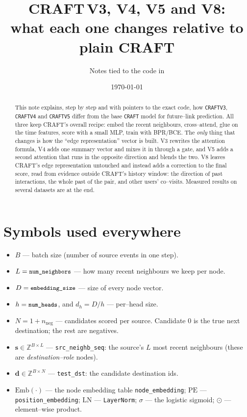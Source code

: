 \documentclass[11pt]{article}
\title{\textbf{CRAFT\,V3, V4, V5 and V8:\\ what each one changes relative to plain CRAFT}}
\author{Notes tied to the code in \code{models/CRAFT*.py}}
\date{\today}
\newcommand{\code}[1]{\texttt{\small #1}}
\newcommand{\elt}{\odot}                 %
\newcommand{\Emb}{\mathrm{Emb}}
\newcommand{\LN}{\mathrm{LN}}
\newcommand{\pos}{\mathrm{PE}}
\begin{document}
\maketitle

\begin{abstract}
This note explains, step by step and with pointers to the exact code, how
\code{CRAFTV3}, \code{CRAFTV4} and \code{CRAFTV5} differ from the base
\code{CRAFT} model for future--link prediction. All three keep CRAFT's overall
recipe: embed the recent neighbours, cross--attend, glue on the time features,
score with a small MLP, train with BPR/BCE. The \emph{only} thing that changes
is how the ``edge representation'' vector is built. V3 rewrites the attention
formula, V4 adds one summary vector and mixes it in through a gate, and V5 adds
a second attention that runs in the opposite direction and blends the two.
V8 leaves CRAFT's edge representation untouched and instead adds a correction to
the final score, read from evidence outside CRAFT's history window: the
direction of past interactions, the whole past of the pair, and other users'
co--visits.
Measured results on several datasets are at the end.
\end{abstract}

\section{Symbols used everywhere}

\begin{itemize}[nosep]
  \item $B$ --- batch size (number of source events in one step).
  \item $L=\code{num\_neighbors}$ --- how many recent neighbours we keep per node.
  \item $D=\code{embedding\_size}$ --- size of every node vector.
  \item $h=\code{num\_heads}$, and $d_h=D/h$ --- per--head size.
  \item $N=1+n_{\text{neg}}$ --- candidates scored per source. Candidate $0$ is
        the true next destination; the rest are negatives.
  \item $\bm{s}\in\mathbb{Z}^{B\times L}$ --- \code{src\_neighb\_seq}: the source's
        $L$ most recent neighbours (these are \emph{destination--role} nodes).
  \item $\bm{d}\in\mathbb{Z}^{B\times N}$ --- \code{test\_dst}: the candidate
        destination ids.
  \item $\Emb(\cdot)$ --- the node embedding table \code{node\_embedding};
        $\pos$ --- \code{position\_embedding}; $\LN$ --- \code{LayerNorm};
        $\sigma$ --- the logistic sigmoid; $\elt$ --- element--wise product.
\end{itemize}
\end{document}
